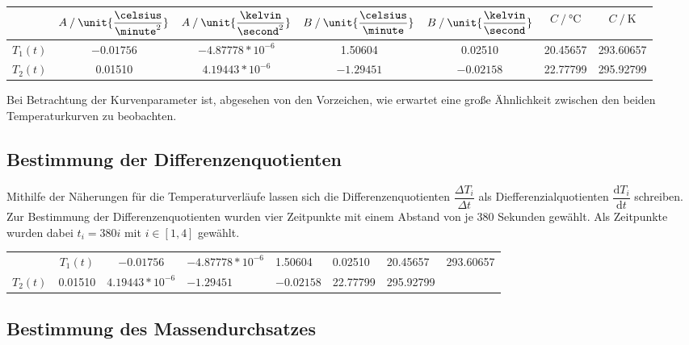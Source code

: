 \begin{table}[H]
  \centering
  \label{tab:ApproxTemp}
  \begin{tabular}{S S S S S S[table-format=2.5] S[table-format=3.5]}
    \toprule
    & {$A \mathbin{/} \unit{\dfrac{\celsius}{\minute^2}}$} & {$A \mathbin{/} \unit{\dfrac{\kelvin}{\second^2}}$} 
    & {$B \mathbin{/} \unit{\dfrac{\celsius}{\minute}}$} & {$B \mathbin{/} \unit{\dfrac{\kelvin}{\second}}$} 
    & {$C \mathbin{/} \unit{\celsius}$} &  {$C \mathbin{/} \unit{\kelvin}$} \\
    \midrule
    {$T_1(t)$} & {$-0.01756$} &  {$-4.87778*10^{-6}$} & {1.50604} & {0.02510} & {20.45657} & {293.60657} \\
    {$T_2(t)$} & {0.01510} & {$4.19443*10^{-6}$} & {$-1.29451$} & {$-0.02158$} & {22.77799} & {295.92799} \\
    \bottomrule
  \end{tabular}
\end{table}

Bei Betrachtung der Kurvenparameter ist, abgesehen von den Vorzeichen, wie erwartet eine große Ähnlichkeit zwischen den
beiden Temperaturkurven zu beobachten.

\subsection{Bestimmung der Differenzenquotienten}

Mithilfe der Näherungen für die Temperaturverläufe lassen sich die Differenzenquotienten $\dfrac{ΔT_i}{Δt}$ als Diefferenzialquotienten
$\dfrac{\text{d}T_i}{\text{d}t}$ schreiben.
Zur Bestimmung der Differenzenquotienten wurden vier Zeitpunkte mit einem Abstand von je 380 Sekunden gewählt.
Als Zeitpunkte wurden dabei $t_i = 380i$ mit $i \in [1,4]$ gewählt.

\begin{table}[H]
  \centering
  \label{tab:Diffquo}
  \begin{tabular}{S S S}
    \toprule
    & 
    \midrule
    {$T_1(t)$} & {$-0.01756$} &  {$-4.87778*10^{-6}$} & {1.50604} & {0.02510} & {20.45657} & {293.60657} \\
    {$T_2(t)$} & {0.01510} & {$4.19443*10^{-6}$} & {$-1.29451$} & {$-0.02158$} & {22.77799} & {295.92799} \\
    \bottomrule
  \end{tabular}
\end{table}


\subsection{Bestimmung des Massendurchsatzes}

